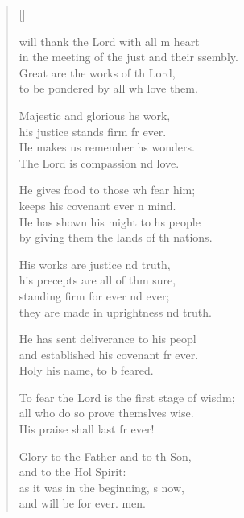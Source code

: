 \settowidth{\versewidth}{To fear the Lord is the first stage of wisdom; +}
\begin{verse}[\versewidth]
  \begin{patverse}
 will thank the Lord with all m heart\Med\\
    in the meeting of the just and their ssembly.\\
Great are the works of th Lord,\Med\\
    to be pondered by all wh love them.

Majestic and glorious h\pointup{\i}s work,\Med\\
    his justice stands firm fr ever.\\
He makes us remember h\pointup{\i}s wonders.\Med\\
    The Lord is compassion nd love.

He gives food to those wh fear him;\Med\\
    keeps his covenant ever \pointup{\i}n mind.\\
He has shown his might to h\pointup{\i}s people\Med\\
    by giving them the lands of th nations.

His works are justice nd truth,\Med\\
    his precepts are all of thm sure,\\
standing firm for ever nd ever;\Med\\
    they are made in uprightness nd truth.

He has sent deliverance to his peopl\Flex\\
    and established his covenant fr ever.\Med\\
    Holy his name, to b feared.

To fear the Lord is the first stage of wisdm;\Flex\\
    all who do so prove themslves wise.\Med\\
His praise shall last fr ever!

Glory to the Father and to th Son,\Med\\
    and to the Hol Spirit:\\
as it was in the beginning, \pointup{\i}s now,\Med\\
    and will be for ever. men.
  \end{patverse}
\end{verse}
